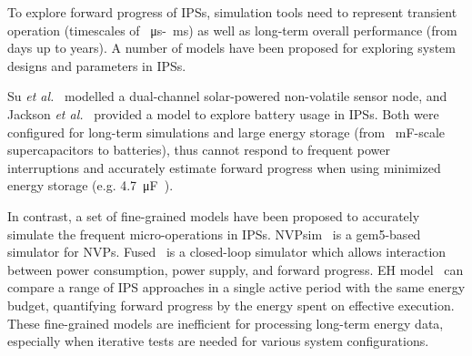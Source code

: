 


To explore forward progress of IPSs, simulation tools need to represent transient operation (timescales of \SI{}{\micro\second}-\SI{}{\milli\second}) as well as long-term overall performance (from days up to years). 
A number of models have been proposed for exploring system designs and parameters in IPSs.

Su \textit{et al.}~\cite{Su:2019:TFR:3340300.3320270} modelled a dual-channel solar-powered non-volatile sensor node, and Jackson \textit{et al.}~\cite{Jackson:2019:COC:3302506.3310400} provided a model to explore battery usage in IPSs. 
Both were configured for long-term simulations and large energy storage (from \SI{}{\milli\farad}-scale supercapacitors to batteries), thus cannot respond to frequent power interruptions and accurately estimate forward progress when using minimized energy storage (e.g. \SI{4.7}{\micro\farad}~\cite{10.1145/3281300}).

In contrast, a set of fine-grained models have been proposed to accurately simulate the frequent micro-operations in IPSs. 
NVPsim~\cite{7428003} is a gem5-based simulator for NVPs.
Fused~\cite{sliper2020fused} is a closed-loop simulator which allows interaction between power consumption, power supply, and forward progress. 
EH model~\cite{8574572} can compare a range of IPS approaches in a single active period with the same energy budget, quantifying forward progress by the energy spent on effective execution. 
These fine-grained models are inefficient for processing long-term energy data, especially when iterative tests are needed for various system configurations. 

